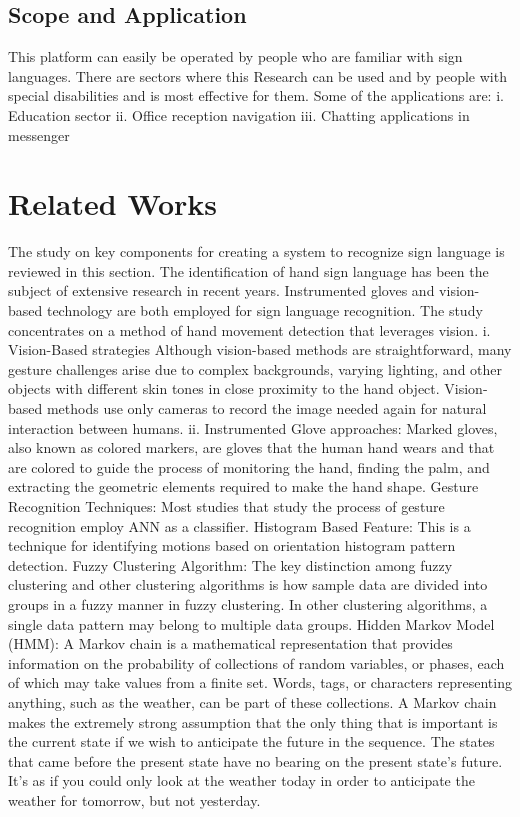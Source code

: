 \documentclass[fleqn, 11pt, twoside]{IOEGC}
\begin{document}
\subsection{Scope and Application}
This platform can easily be operated by people who are familiar with sign languages. There are sectors where this Research can be used and by people with special disabilities and is most effective for them. Some of the applications are:
i.	Education sector
ii.	Office reception navigation
iii.	Chatting applications in messenger

\section{Related Works}
The study on key components for creating a system to recognize sign language is reviewed in this section. The identification of hand sign language has been the subject of extensive research in recent years. Instrumented gloves and vision-based technology are both employed for sign language recognition. The study concentrates on a method of hand movement detection that leverages vision.
i. Vision-Based strategies
Although vision-based methods are straightforward, many gesture challenges arise due to complex backgrounds, varying lighting, and other objects with different skin tones in close proximity to the hand object. Vision-based methods use only cameras to record the image needed again for natural interaction between humans.  
ii. Instrumented Glove approaches: 
Marked gloves, also known as colored markers, are gloves that the human hand wears and that are colored to guide the process of monitoring the hand, finding the palm, and extracting the geometric elements required to make the hand shape.
Gesture Recognition Techniques:  
Most studies that study the process of gesture recognition employ ANN as a classifier.
Histogram Based Feature: 
This is a technique for identifying motions based on orientation histogram pattern detection.
Fuzzy Clustering Algorithm:
The key distinction among fuzzy clustering and other clustering algorithms is how sample data are divided into groups in a fuzzy manner in fuzzy clustering. In other clustering algorithms, a single data pattern may belong to multiple data groups.\cite{sethi2012}
Hidden Markov Model (HMM):
A Markov chain is a mathematical representation that provides information on the probability of collections of random variables, or phases, each of which may take values from a finite set. Words, tags, or characters representing anything, such as the weather, can be part of these collections. A Markov chain makes the extremely strong assumption that the only thing that is important is the current state if we wish to anticipate the future in the sequence. The states that came before the present state have no bearing on the present state's future. It's as if you could only look at the weather today in order to anticipate the weather for tomorrow, but not yesterday.\cite{nayakwadi2013} 
\end{document}
